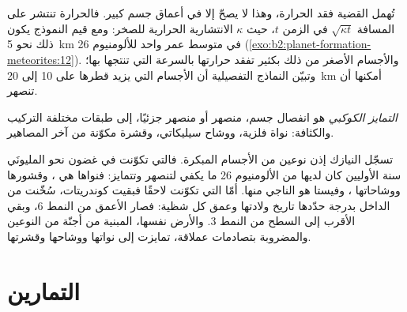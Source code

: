 \begin{omfigure}
\par{}
\end{omfigure}

تُهمل القضية فقد الحرارة، وهذا لا يصحّ إلا في أعماق جسم كبير.
فالحرارة تنتشر على المسافة $\sqrt{\kappa t}$ في الزمن $t$، حيث
$\kappa$ الانتشارية الحرارية للصخر: ومع قيم النموذج يكون ذلك
نحو \qty{5}{km} في متوسط عمر واحد للألومنيوم 26 (\cref{exo:b2:planet-formation-meteorites:12}). والأجسام الأصغر
من ذلك بكثير تفقد حرارتها بالسرعة التي تنتجها بها؛ وتبيّن النماذج التفصيلية
أن الأجسام التي يزيد قطرها على 10 إلى \qty{20}{km} أمكنها أن تنصهر.

\begin{definition}
\label{def:b2:planet-formation-meteorites:differentiation}
\emph{التمايز الكوكبي} هو
انفصال جسم، منصهر أو منصهر جزئيًا، إلى طبقات مختلفة
التركيب والكثافة: نواة فلزية، ووشاح سيليكاتي، وقشرة مكوّنة من
آخر المصاهير.
\end{definition}

تسجّل النيازك إذن نوعين من الأجسام المبكرة. فالتي تكوّنت في غضون
نحو المليونَي سنة الأوليين كان لديها من الألومنيوم 26 ما يكفي لتنصهر
وتتمايز: فنواها هي ، وقشورها ووشاحاتها
، وفيستا هو الناجي منها. أمّا التي تكوّنت لاحقًا فبقيت
كوندريتات، سُخّنت من الداخل بدرجة حدّدها تاريخ ولادتها
وعمق كل شظية: فصار الأعمق من النمط 6، وبقي الأقرب إلى السطح
من النمط 3. والأرض نفسها، المبنية من أجنّة  من النوعين
والمضروبة بتصادمات عملاقة، تمايزت إلى نواتها ووشاحها وقشرتها.

\section{التمارين}


